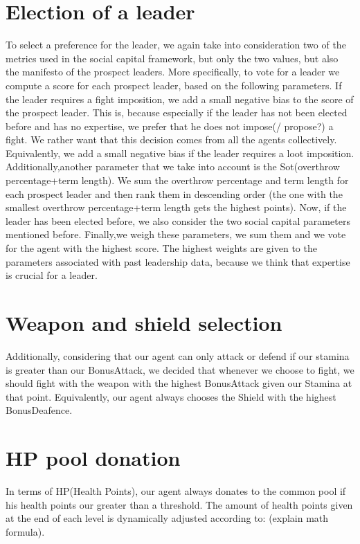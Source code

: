 \section{Election of a leader}To select a preference for the leader, we again take into consideration two of the metrics used in the social capital framework, but only the two values, but also the manifesto of the prospect leaders. More specifically, to vote for a leader we compute a score for each prospect leader, based on the following parameters. If the leader requires a fight imposition, we add a small negative bias to the score of the prospect leader. This is, because especially if the leader has not been elected before and has no expertise, we prefer that he does not impose(/ propose?) a fight. We rather want that this decision comes from all the agents collectively. Equivalently, we add a small negative bias if the leader requires a loot imposition. Additionally,another parameter that we take into account is the Sot(overthrow percentage+term length). We sum the overthrow percentage and term length for each prospect leader and then rank them in descending order (the one with the smallest overthrow percentage+term length gets the highest points). Now, if the leader has been elected before, we also consider the two social capital parameters mentioned before. Finally,we weigh these parameters, we sum them and we vote for the agent with the highest score. The highest weights are given to the parameters associated with past leadership data, because we think that expertise is crucial for a leader.\\

\section{Weapon and shield selection}Additionally, considering that our agent can only attack or defend if our stamina is greater than our BonusAttack, we decided that whenever we choose to fight, we should fight with the weapon with the highest BonusAttack given our Stamina at that point. Equivalently, our agent always chooses the Shield with the highest BonusDeafence.\\

\section{HP pool donation}In terms of HP(Health Points), our agent always donates to the common pool if his health points our greater than a threshold. The amount of health points given at the end of each level is dynamically adjusted according to: (explain math formula).

